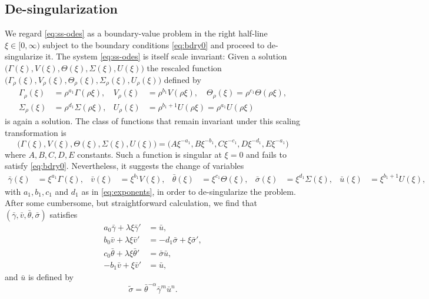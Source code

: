 \documentclass[11pt]{article}
\def\bg{{\bar{\gamma}}}
\def\bv{{\bar{v}}}
\def\bth{{\bar{\theta}}}
\def\bs{{\bar{\sigma}}}
\def\bu{{\bar{u}}}
\def\ts{{\tilde{\sigma}}}
\theoremstyle{remark}
\begin{document}
\subsection{De-singularization}
We regard \eqref{eq:ss-odes} as a boundary-value problem in the right  half-line $\xi \in [0,\infty)$ subject to the boundary conditions \eqref{eq:bdry0} and proceed to
de-singularize it. The system \eqref{eq:ss-odes} is itself scale invariant: Given a solution $\big(\Gamma(\xi), V(\xi), \Theta(\xi), \Sigma(\xi), U(\xi)\big)$ the rescaled
function $\big(\Gamma_\rho(\xi), V_\rho(\xi), \Theta_\rho(\xi), \Sigma_\rho(\xi), U_\rho(\xi)\big)$ defined by
\begin{equation}
\label{selfsimilardef2}
\begin{aligned}
 \Gamma_\rho(\xi)&=\rho^{a_1}\Gamma(\rho\xi), & V_\rho(\xi)&=\rho^{b_1}V(\rho\xi),  \quad  \Theta_\rho(\xi)=\rho^{c_1}\Theta(\rho\xi),\\
 \Sigma_\rho(\xi)&=\rho^{d_1}\Sigma(\rho\xi), & U_\rho(\xi)&=\rho^{b_1+1}U(\rho\xi)=\rho^{a_1}U(\rho\xi)
\end{aligned}
\end{equation}
is again a solution.
The class of functions that remain invariant under this scaling transformation is
 $$\big(\Gamma(\xi), V(\xi), \Theta(\xi), \Sigma(\xi), U(\xi)\big)=\big(A\xi^{-a_1}, B\xi^{-b_1},C\xi^{-c_1},D\xi^{-d_1},E\xi^{-a_1}\big)$$
where $A, B, C, D, E$ constants. Such a function is singular at $\xi =0$ and fails to satisfy \eqref{eq:bdry0}. Nevertheless, it suggests the change of variables
\begin{equation} \label{eq:CAPtoBAR}
\begin{aligned}
 \bg(\xi)&=\xi^{a_1}\Gamma(\xi), &
 \bv(\xi)&=\xi^{b_1}V(\xi), &
 \bth(\xi)&=\xi^{c_1}\Theta(\xi),  & %
 \bs(\xi)&=\xi^{d_1}\Sigma(\xi), &
 \bu(\xi)&=\xi^{b_1+1}U(\xi) ,
\end{aligned}
\end{equation}
with $a_1, b_1, c_1$ and $d_1$ as in \eqref{eq:exponents}, in order to de-singularize the problem.
After some cumbersome, but straightforward calculation, we find that $(\bg,\bv,\bth,\bs)$ satisfies
\begin{equation} \label{eq:barsys}
 \begin{aligned}
  a_0\bg + \lambda\xi\bg' &=\bu,\\
  b_0\bv + \lambda\xi\bv' &=-d_1 \bs + \xi\bs',\\
  c_0\bth+ \lambda\xi\bth'&=\bs\bu,\\
  -b_1\bv+\xi\bv' &= \bu,
 \end{aligned}
\end{equation}
and $\bu$ is defined by
$$  \ts =\bth^{-\alpha}\bg^m\bu^n.$$
\end{document}
